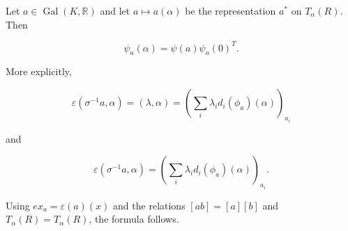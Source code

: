 Let $a \in \operatorname{Gal}(K, \mathbb{R})$ and let $a \mapsto a(\alpha)$ be the representation $a^*$ on $T_{\alpha}(R)$. Then

$$
\psi_a(\alpha) = \psi(a) \psi_a(0)^T.
$$

More explicitly,

$$
\varepsilon(\sigma^{-1}a, \alpha) = (\lambda, \alpha) = \left( \sum_i \lambda_i d_i(\phi_a)(\alpha) \right)_{a_i}
$$

and

$$
\varepsilon(\sigma^{-1}a, \alpha) = \left( \sum_i \lambda_i d_i(\phi_a)(\alpha) \right)_{a_i}.
$$

Using $ex_a = \varepsilon(a)(x)$ and the relations $[ab] = [a][b]$ and $T_{\alpha}(R) = T_{\alpha}(R)$, the formula follows.

